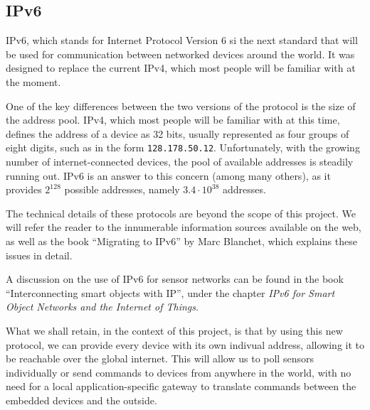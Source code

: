 %


\subsection{IPv6}\label{sub:ipv6}

IPv6, which stands for Internet Protocol Version 6 si the next standard that
will be used for communication between networked devices around the world. It
was designed to replace the current IPv4, which most people will be familiar
with at the moment.

One of the key differences between the two versions of the protocol is the size
of the address pool. IPv4, which most people will be familiar with at this time,
defines the address of a device as 32 bits, usually represented as four groups
of eight digits, such as in the form \texttt{128.178.50.12}. Unfortunately, with
the growing number of internet-connected devices, the pool of available
addresses is steadily running out. IPv6 is an answer to this concern (among many
others), as it provides $2^{128}$ possible addresses, namely $3.4 \cdot 10^{38}$
addresses. 

The technical details of these protocols are beyond the scope of this project.
We will refer the reader to the innumerable information sources available on the
web, as well as the book ``Migrating to IPv6'' by Marc
Blanchet\citep{blanchet2006}, which explains these issues in detail.

A discussion on the use of IPv6 for sensor networks can be found in the book
``Interconnecting smart objects with IP''\citep[chap. 4]{dunkels2010}, under the chapter
\emph{IPv6 for Smart Object Networks and the Internet of Things}.

What we shall retain, in the context of this project, is that by using this new
protocol, we can provide every device with its own indivual address, allowing it
to be reachable over the global internet. This will allow us to poll sensors
individually or send commands to devices from anywhere in the world, with no
need for a local application-specific gateway to translate commands between the
embedded devices and the outside.

